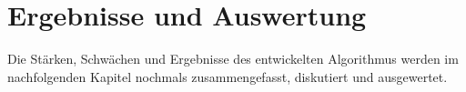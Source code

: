 
\chapter{Ergebnisse und Auswertung}
\label{cha:results}


Die Stärken, Schwächen und Ergebnisse des entwickelten Algorithmus werden im nachfolgenden Kapitel
nochmals zusammengefasst, diskutiert und ausgewertet.